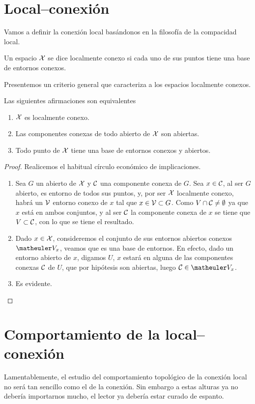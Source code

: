 \section{Local--conexión}
\label{conex_local}
Vamos a definir la conexión local basándonos en la filosofía de la compacidad local.
\begin{defi}
	Un espacio $\mathcal{X}$ se dice localmente conexo si cada uno de sus puntos tiene una base de entornos conexos.
\end{defi}
Presentemos un criterio general que caracteriza a los espacios localmente conexos.
\begin{prop}[Caracterización]\label{conex_prop_caracLocal}Las siguientes afirmaciones son equivalentes
	\begin{enumerate}
		\item $\mathcal{X}$ es localmente conexo.
		\item Las componentes conexas de todo abierto de $\mathcal{X}$ son abiertas.
		\item Todo punto de $\mathcal{X}$ tiene una base de entornos conexos y abiertos.
	\end{enumerate}
\end{prop}
\begin{proof}Realicemos el habitual círculo económico de implicaciones.
	\begin{enumerate}[align=left, leftmargin=*]
		\item[\fbox{$(1)\ra (2)$}] Sea $G$ un abierto de $\mathcal{X}$ y $\mathcal{C}$ una componente conexa de $G$. Sea $x\in \mathcal{C}$, al ser $G$ abierto, es entorno de todos sus puntos, y, por ser $\mathcal{X}$ localmente conexo, habrá un $\mathcal{V}$ entorno conexo de $x$ tal que $x\in \mathcal{V}\subset G$. Como $V\cap\mathcal{C}\not=\emptyset$ ya que $x$ está en ambos conjuntos, y al ser $\mathcal{C}$ la componente conexa de $x$ se tiene que $V\subset\mathcal{C}$, con lo que se tiene el resultado.
		\item[\fbox{$(2)\ra (3)$}] Dado $x\in\mathcal{X}$, consideremos el conjunto de sus entornos abiertos conexos $\Va{x}$, veamos que es una base de entornos. En efecto, dado un entorno abierto de $x$, digamos $U$, $x$ estará en alguna de las componentes conexas $\mathcal{C}$ de $U$, que por hipótesis son abiertas, luego $\Co\in\Va{x}$.  
		\item[\fbox{$(3)\ra (1)$}] Es evidente.\qedhere
	\end{enumerate}
\end{proof}
\section{Comportamiento de la local--conexión}
Lamentablemente, el estudio del comportamiento topológico de la conexión local no será tan sencillo como el de la conexión. Sin embargo a estas alturas ya no debería importarnos mucho, el lector ya debería estar curado de espanto.

